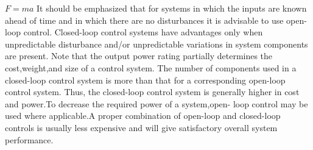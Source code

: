 \documentclass{report}
\begin{document}
$F = ma$ It should be emphasized that for systems in which the inputs are known ahead of time and in which there are no disturbances it is advisable to use open-loop control.  Closed-loop control systems have advantages only when unpredictable disturbance  and/or unpredictable variations in system components are present. Note that the  output power rating partially determines the cost,weight,and size of a control system.  The number of components used in a closed-loop control system is more than that for  a corresponding open-loop control system. Thus, the closed-loop control system is generally higher in cost and power.To decrease the required power of a system,open-  loop control may be used where applicable.A proper combination of open-loop and  closed-loop controls is usually less expensive and will give satisfactory overall system  performance.
\end{document}
